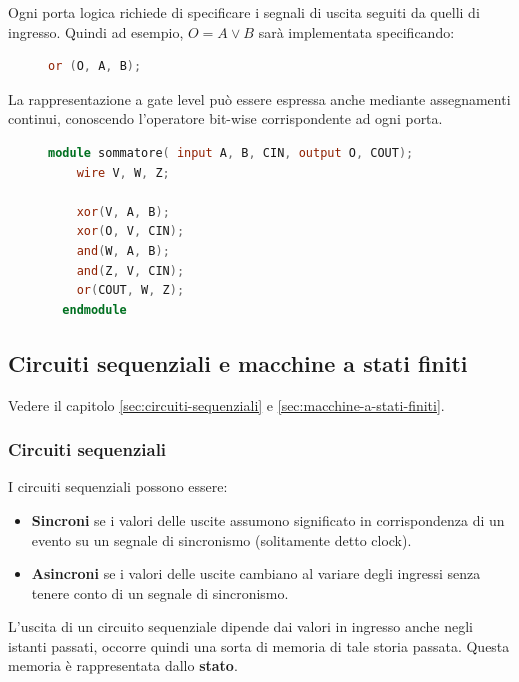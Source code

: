 \documentclass[a4paper]{article}
\theoremstyle{break}
\theoremstyle{break}
\theoremstyle{break}
\theoremstyle{break}
\begin{document}
Ogni porta logica richiede di specificare i segnali di uscita seguiti da quelli di ingresso.
Quindi ad esempio, \( O = A \vee B \) sarà implementata specificando:
\begin{figure}[H]
  \begin{lstlisting}[language=Verilog]
  or (O, A, B);
  \end{lstlisting}
\end{figure}
La rappresentazione a gate level può essere espressa anche mediante assegnamenti continui,
conoscendo l'operatore bit-wise corrispondente ad ogni porta.

\begin{figure}[H]
  \begin{example}
  \begin{lstlisting}[language=Verilog]
  module sommatore( input A, B, CIN, output O, COUT);
    wire V, W, Z;
    
    xor(V, A, B);
    xor(O, V, CIN);
    and(W, A, B);
    and(Z, V, CIN);
    or(COUT, W, Z);
  endmodule
  \end{lstlisting}
\end{example}
\end{figure}

\subsection{Circuiti sequenziali e macchine a stati finiti}
Vedere il capitolo \ref{sec:circuiti-sequenziali} e \ref{sec:macchine-a-stati-finiti}.
\subsubsection{Circuiti sequenziali}

I circuiti sequenziali possono essere:
\begin{itemize}
  \item \textbf{Sincroni} se i valori delle uscite assumono significato in corrispondenza
    di un evento su un segnale di sincronismo (solitamente detto clock).
  \item \textbf{Asincroni} se i valori delle uscite cambiano al variare degli ingressi senza
    tenere conto di un segnale di sincronismo.
\end{itemize}
L’uscita di un circuito sequenziale dipende dai valori in ingresso anche negli
istanti passati, occorre quindi una sorta di memoria di tale storia passata.
Questa memoria è rappresentata dallo \textbf{stato}.
\end{document}
